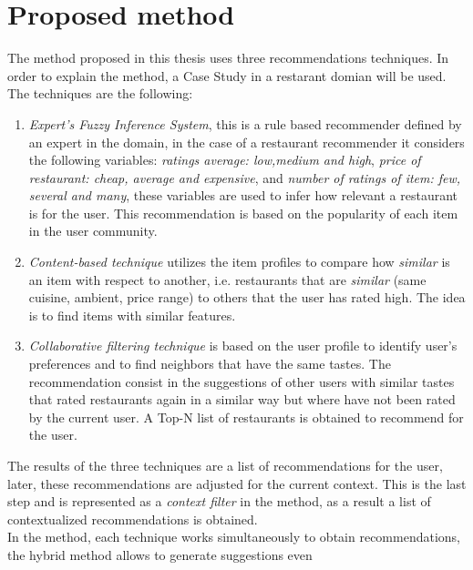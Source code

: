 \chapter{Proposed method}\label{method}





The method proposed in this thesis uses three recommendations techniques.
In order to explain the method, a Case Study in a restarant domian will be used.
The techniques are the following:
\begin{enumerate} 
\item \textit{Expert's Fuzzy Inference System}, this is a rule based recommender
defined by an expert in the domain, in the case of a restaurant recommender
it considers the following
variables: \textit{ratings average: low,medium and high},
\textit{price of restaurant: cheap, average and expensive}, and
\textit{number of ratings of item: few, several and many}, these
variables are used to infer how relevant a restaurant is for the user.
This recommendation is based on the popularity of each item in the
user community.
\item \textit{Content-based technique} utilizes the item profiles 
to compare how \textit{similar} is an item with respect to 
another, i.e. restaurants that are \textit{similar} (same cuisine, 
ambient, price range) to others that the user has rated high. 
The idea is to find items with similar features. 
\item \textit{Collaborative filtering technique} is based on the user
profile to identify user's preferences and to find neighbors that
have the same tastes. The recommendation consist in the suggestions of
other users with similar tastes that rated restaurants again in a
similar way but where have not been rated by the current user. A Top-N
list of restaurants is obtained to recommend for the user.
\end{enumerate} 
The results of the three techniques are a list of recommendations for
the user, later, these recommendations are adjusted for the current context. This
is the last step and is represented as a \textit{context filter} in the
method, as a result a list of contextualized
recommendations is obtained. \\
In the method, each technique works simultaneously to obtain
recommendations, the hybrid method allows to generate suggestions even
